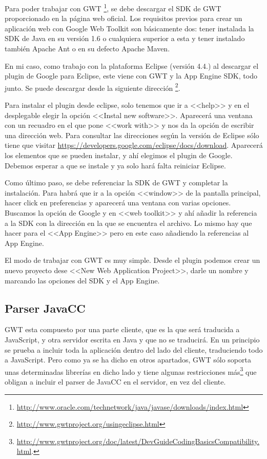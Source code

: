 Para poder trabajar con GWT \footnote{\url{http://www.oracle.com/technetwork/java/javase/downloads/index.html}}, se debe descargar el SDK de GWT proporcionado en la página web oficial. Los requisitos previos para crear un aplicación web con Google Web Toolkit son básicamente dos: tener instalada la SDK de Java en su versión 1.6 o cualquiera superior a esta y tener instalado también Apache Ant o en su defecto Apache Maven.

En mi caso, como trabajo con la plataforma Eclipse (versión 4.4.) al descargar el plugin de Google para Eclipse, este viene con GWT y la App Engine SDK, todo junto. Se puede descargar desde la siguiente dirección \footnote{\url{http://www.gwtproject.org/usingeclipse.html}}.

Para instalar el plugin desde eclipse, solo tenemos que ir a <<help>> y en el desplegable elegir la opción <<Instal new software>>. Aparecerá una ventana con un recuadro en el que pone <<work with>> y nos da la opción de escribir una dirección web. Para consultar las direcciones según la versión de Eclipse sólo tiene que visitar \url{https://developers.google.com/eclipse/docs/download}.
Aparecerá los elementos que se pueden instalar, y ahí elegimos el plugin de Google. Debemos esperar a que se instale y ya solo hará falta reiniciar Eclipse.

Como último paso, se debe referenciar la SDK de GWT y completar la instalación. Para habrá que ir a la opción <<window>> de la pantalla principal, hacer click en preferencias y aparecerá una ventana con varias opciones. Buscamos la opción de Google y en <<web toolkit>> y ahí añadir la referencia a la SDK con la dirección en la que se encuentra el archivo. Lo mismo hay que hacer para el <<App Engine>> pero en este caso añadiendo la referencias al App Engine.

El modo de trabajar con GWT es muy simple. Desde el plugin podemos crear un nuevo proyecto dese <<New Web Application Project>>, darle un nombre y marcando las opciones del SDK y el App Engine.

 
\subsection{Parser JavaCC}

GWT esta compuesto por una parte cliente, que es la que será traducida a JavaScript, y otra servidor escrita en Java y que no se traducirá. En un principio se prueba a incluir toda la aplicación dentro del lado del cliente, traduciendo todo a JavaScript. Pero como ya se ha dicho en otros apartados, GWT sólo soporta unas determinadas librerías en dicho lado y tiene algunas restricciones más\footnote{\url{http://www.gwtproject.org/doc/latest/DevGuideCodingBasicsCompatibility.html}.} que obligan a incluir el parser de JavaCC en el servidor, en vez del cliente.

